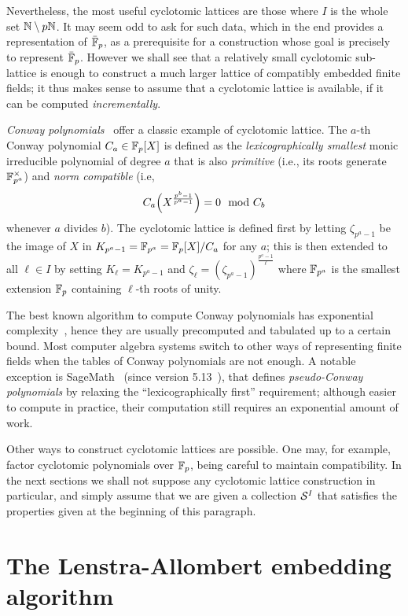 \documentclass[sigconf]{acmart}
\begin{document}
Nevertheless, the most useful cyclotomic lattices are those where $I$
is the whole set $\mathbb{N}\setminus p\mathbb{N}$.
It may seem odd to ask for such data, which in the end provides a representation of $\bar{\mathbb{F}}_p$,
as a prerequisite for a construction whose goal is precisely to represent $\bar{\mathbb{F}}_p$.
However we shall see that a relatively small cyclotomic sub-lattice is
enough to construct a much larger lattice of compatibly embedded
finite fields; it thus makes sense to assume that a cyclotomic lattice
is available, if it can be computed \emph{incrementally}.

\emph{Conway polynomials}~\cite{Nickel1988} offer a classic example of
cyclotomic lattice. %
The $a$-th Conway polynomial $C_a\in\mathbb{F}_p[X]$ is defined as the
\emph{lexicographically smallest} monic irreducible polynomial of
degree $a$ that is also \emph{primitive} (i.e., its roots generate
$\mathbb{F}_{p^a}^\times$) and \emph{norm compatible} (i.e,
$$C_a\Bigl(X^{\frac{p^b-1}{p^a-1}}\Bigr) = 0 \mod C_b$$
whenever $a$ divides $b$). %
The cyclotomic lattice is defined first by letting $\zeta_{p^a-1}$ be the
image of $X$ in $K_{p^a-1}=\mathbb{F}_{p^a}=\mathbb{F}_p[X]/C_a$ for any $a$;
this is then extended to all $\ell\in I$ by setting $K_\ell=K_{p^a-1}$
and $\zeta_\ell=(\zeta_{p^a-1})^{\frac{p^a-1}{\ell}}$
where $\mathbb{F}_{p^a}$ is the smallest extension $\mathbb{F}_p$ containing $\ell$-th roots of unity.

The best known algorithm to compute Conway polynomials has exponential
complexity~\cite{heath+loehr99}, hence they are usually precomputed
and tabulated up to a certain bound. %
Most computer algebra systems switch to other ways of representing
finite fields when the tables of Conway polynomials are not enough. %
A notable exception is SageMath~\cite{Sage} (since version
5.13~\cite{Roe2013}), that defines \emph{pseudo-Conway polynomials} by
relaxing the ``lexicographically first'' requirement; although
easier to compute in practice, their computation still requires an
exponential amount of work.

Other ways to construct cyclotomic lattices are possible. %
One may, for example, factor cyclotomic polynomials over $\mathbb{F}_p$, being
careful to maintain compatibility. %
In the next sections we shall not suppose any cyclotomic lattice
construction in particular, and simply assume that we are given a
collection $\mathcal{S}^{I}$ that satisfies the properties given at the
beginning of this paragraph.

\section{The Lenstra-Allombert embedding algorithm}
\label{sec:lenstra}
\end{document}
